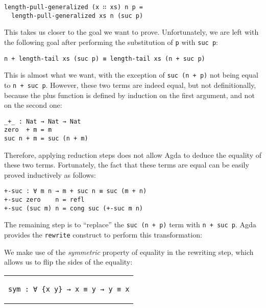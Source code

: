 \documentclass[runningheads]{llncs}
\begin{document}
\begin{lstlisting}
length-pull-generalized (x ∷ xs) n p =
  length-pull-generalized xs n (suc p)
\end{lstlisting}

This takes us closer to the goal we want to prove. Unfortunately, we are left with the
following goal after performing the substitution of \lstinline{p} with \lstinline{suc p}:

\begin{lstlisting}
n + length-tail xs (suc p) ≡ length-tail xs (n + suc p)
\end{lstlisting}

This is almost what we want, with the exception of \lstinline{suc (n + p)} not being
equal to \lstinline{n + suc p}. However, these two terms are indeed equal, but not
definitionally, because the plus function is defined by induction on the first argument,
and not on the second one:

\begin{lstlisting}
_+_ : Nat → Nat → Nat
zero  + m = m
suc n + m = suc (n + m)
\end{lstlisting}

Therefore, applying reduction steps does not allow Agda to deduce the equality of these
two terms. Fortunately, the fact that these terms are equal can be easily proved
inductively as follows:

\begin{lstlisting}
+-suc : ∀ m n → m + suc n ≡ suc (m + n)
+-suc zero    n = refl
+-suc (suc m) n = cong suc (+-suc m n)
\end{lstlisting}

The remaining step is to ``replace'' the \lstinline{suc (n + p)} term with
\lstinline{n + suc p}. Agda provides the \lstinline{rewrite} construct to perform this
transformation:



We make use of the \emph{symmetric} property of equality in the rewriting step, which
allows us to flip the sides of the equality:

\begin{center}
\begin{tabular}{c}
\begin{lstlisting}
sym : ∀ {x y} → x ≡ y → y ≡ x
\end{lstlisting}
\end{tabular}
\end{center}
\end{document}
